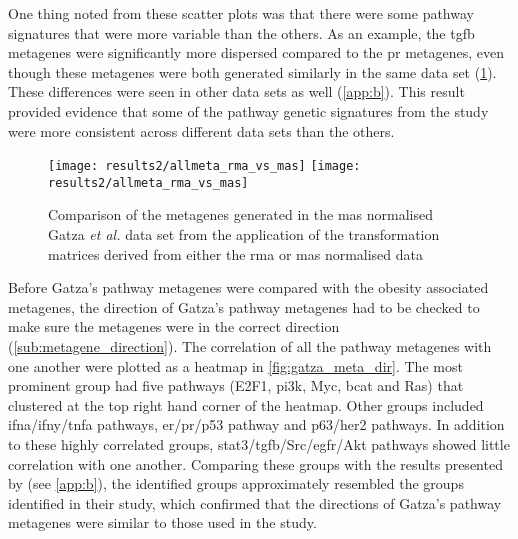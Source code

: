 One thing noted from these scatter plots was that there were some pathway signatures that were more variable than the others.
As an example, the \gls{tgfb} metagenes were significantly more dispersed compared to the \gls{pr} metagenes, even though these metagenes were both generated similarly in the same data set (\cref{fig:gt_rma_vs_mas}).
These differences were seen in other data sets as well (\cref{app:b}).
This result provided evidence that some of the pathway genetic signatures from the \citet{Gatza2010a} study were more consistent across different data sets than the others.
\\

\begin{figure}[htpb]
	\centering
	\texttt{[image: results2/allmeta\_rma\_vs\_mas]}
	\texttt{[image: results2/allmeta\_rma\_vs\_mas]}
	\caption{Comparison of the metagenes generated in the \gls{mas} normalised Gatza \textit{et al.} data set from the application of the transformation matrices derived from either the \gls{rma} or \gls{mas} normalised data}
	\label{fig:gt_rma_vs_mas}
\end{figure}

\noindent
Before Gatza's pathway metagenes were compared with the obesity associated metagenes, the direction of Gatza's pathway metagenes had to be checked to make sure the metagenes were in the correct direction (\cref{sub:metagene_direction}).
The correlation of all the pathway metagenes with one another were plotted as a heatmap in \cref{fig:gatza_meta_dir}.
The most prominent group had five pathways (E2F1, \gls{pi3k}, Myc, \gls{bcat} and Ras) that clustered at the top right hand corner of the heatmap.
Other groups included \gls{ifna}/\gls{ifny}/\gls{tnfa} pathways, \gls{er}/\gls{pr}/p53 pathway and p63/\gls{her2} pathways.
In addition to these highly correlated groups, \gls{stat3}/\gls{tgfb}/Src/\gls{egfr}/Akt pathways showed little correlation with one another.
Comparing these groups with the results presented by \citet{Gatza2010a} (see \cref{app:b}), the identified groups approximately resembled the groups identified in their study, which confirmed that the directions of Gatza's pathway metagenes were similar to those used in the \citet{Gatza2010a} study.

